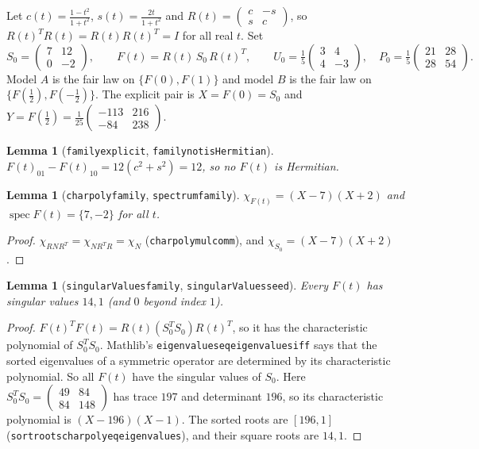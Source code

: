 \documentclass[11pt]{article}
\newtheorem{lemma}[theorem]{Lemma}
\theoremstyle{definition}
\theoremstyle{remark}
\renewcommand{\_}{\oldus\allowbreak}
\begin{document}
Let $c(t)=\frac{1-t^2}{1+t^2}$, $s(t)=\frac{2t}{1+t^2}$ and $R(t)=\begin{pmatrix}c&-s\\ s&c\end{pmatrix}$, so
$R(t)^{T}R(t)=R(t)R(t)^T=I$ for all real $t$. Set
\[
S_0=\begin{pmatrix}7&12\\0&-2\end{pmatrix},\qquad F(t)=R(t)\,S_0\,R(t)^T,\qquad
U_0=\tfrac15\begin{pmatrix}3&4\\4&-3\end{pmatrix},\quad P_0=\tfrac15\begin{pmatrix}21&28\\28&54\end{pmatrix}.
\]
Model $A$ is the fair law on $\{F(0),F(1)\}$ and model $B$ is the fair law on $\{F(\tfrac12),F(-\tfrac12)\}$.
The explicit pair is $X=F(0)=S_0$ and $Y=F(\tfrac12)=\tfrac1{25}\begin{pmatrix}-113&216\\-84&238\end{pmatrix}$.

\begin{lemma}[\texttt{family\_explicit}, \texttt{family\_not\_isHermitian}]
$F(t)_{01}-F(t)_{10}=12(c^2+s^2)=12$, so no $F(t)$ is Hermitian.
\end{lemma}

\begin{lemma}[\texttt{charpoly\_family}, \texttt{spectrum\_family}]
$\chi_{F(t)}=(X-7)(X+2)$ and $\operatorname{spec}F(t)=\{7,-2\}$ for all $t$.
\end{lemma}
\begin{proof}
$\chi_{R N R^T}=\chi_{N R^T R}=\chi_N$ (\texttt{charpoly\_mul\_comm}), and $\chi_{S_0}=(X-7)(X+2)$.
\end{proof}

\begin{lemma}[\texttt{singularValues\_family}, \texttt{singularValues\_seed}]
Every $F(t)$ has singular values $14,1$ (and $0$ beyond index $1$).
\end{lemma}
\begin{proof}
$F(t)^TF(t)=R(t)(S_0^TS_0)R(t)^T$, so it has the characteristic polynomial of $S_0^TS_0$. Mathlib's
\texttt{eigenvalues\_eq\_eigenvalues\_iff} says that the sorted eigenvalues of a symmetric operator are
determined by its characteristic polynomial. So all $F(t)$ have the singular values of $S_0$. Here
$S_0^TS_0=\begin{pmatrix}49&84\\84&148\end{pmatrix}$ has trace $197$ and determinant $196$, so its
characteristic polynomial is $(X-196)(X-1)$. The sorted roots are $[196,1]$
(\texttt{sort\_roots\_charpoly\_eq\_eigenvalues}), and their square roots are $14,1$.
\end{proof}
\end{document}
